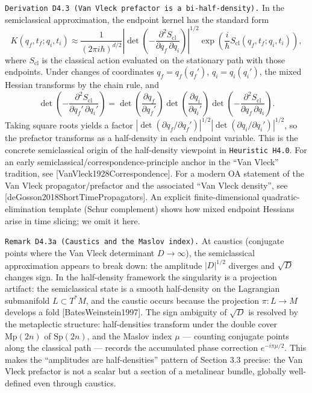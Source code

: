 \documentclass[
]{article}
\begin{document}
\texttt{Derivation\ D4.3\ (Van\ Vleck\ prefactor\ is\ a\ bi-half-density).}
In the semiclassical approximation, the endpoint kernel has the standard
form \[
K(q_f,t_f;q_i,t_i)\approx
\frac{1}{(2\pi i\hbar)^{d/2}}
\left|\det\!\left(-\frac{\partial^2 S_{\mathrm{cl}}}{\partial q_f\,\partial q_i}\right)\right|^{1/2}
\exp\!\left(\frac{i}{\hbar}S_{\mathrm{cl}}(q_f,t_f;q_i,t_i)\right),
\] where \(S_{\mathrm{cl}}\) is the classical action evaluated on the
stationary path with those endpoints. Under changes of coordinates
\(q_f=q_f(q_f')\), \(q_i=q_i(q_i')\), the mixed Hessian transforms by
the chain rule, and \[
\det\!\left(-\frac{\partial^2 S_{\mathrm{cl}}}{\partial q_f'\,\partial q_i'}\right)
=
\det\!\left(\frac{\partial q_f}{\partial q_f'}\right)
\det\!\left(\frac{\partial q_i}{\partial q_i'}\right)
\det\!\left(-\frac{\partial^2 S_{\mathrm{cl}}}{\partial q_f\,\partial q_i}\right).
\] Taking square roots yields a factor
\(|\det(\partial q_f/\partial q_f')|^{1/2}|\det(\partial q_i/\partial q_i')|^{1/2}\),
so the prefactor transforms as a half-density in each endpoint variable.
This is the concrete semiclassical origin of the half-density viewpoint
in \texttt{Heuristic\ H4.0}. For an early
semiclassical/correspondence-principle anchor in the ``Van Vleck''
tradition, see {[}VanVleck1928Correspondence{]}. For a modern OA
statement of the Van Vleck propagator/prefactor and the associated ``Van
Vleck density'', see {[}deGosson2018ShortTimePropagators{]}. An explicit
finite-dimensional quadratic-elimination template (Schur complement)
shows how mixed endpoint Hessians arise in time slicing; we omit it
here.

\texttt{Remark\ D4.3a\ (Caustics\ and\ the\ Maslov\ index).} At caustics
(conjugate points where the Van Vleck determinant \(D\to\infty\)), the
semiclassical approximation appears to break down: the amplitude
\(|D|^{1/2}\) diverges and \(\sqrt{D}\) changes sign. In the
half-density framework the singularity is a projection artifact: the
semiclassical state is a smooth half-density on the Lagrangian
submanifold \(L\subset T^\ast M\), and the caustic occurs because the
projection \(\pi:L\to M\) develops a fold {[}BatesWeinstein1997{]}. The
sign ambiguity of \(\sqrt{D}\) is resolved by the metaplectic structure:
half-densities transform under the double cover \(\mathrm{Mp}(2n)\) of
\(\mathrm{Sp}(2n)\), and the Maslov index \(\mu\) --- counting conjugate
points along the classical path --- records the accumulated phase
correction \(e^{-i\pi\mu/2}\). This makes the ``amplitudes are
half-densities'' pattern of Section 3.3 precise: the Van Vleck prefactor
is not a scalar but a section of a metalinear bundle, globally
well-defined even through caustics.
\end{document}
